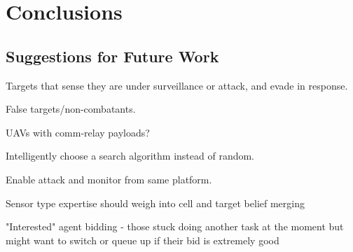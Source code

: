 \chapter{Conclusions}


\section{Suggestions for Future Work}
Targets that sense they are under surveillance or attack, and evade in response.

False targets/non-combatants.

UAVs with comm-relay payloads?

Intelligently choose a search algorithm instead of random.


Enable attack and monitor from same platform.

Sensor type expertise should weigh into cell and target belief merging


"Interested" agent bidding - those stuck doing another task at the moment but might want to switch or queue up if their bid is extremely good